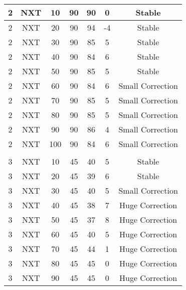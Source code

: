 \begin{longtable}[c]{|ccccccc|}
2  & NXT  & 10     & 90    & 90                & 0          & Stable                  \\\hline
2  & NXT  & 20     & 90    & 94                & -4         & Stable                  \\\hline
2  & NXT  & 30     & 90    & 85                & 5          & Stable                  \\\hline
2  & NXT  & 40     & 90    & 84                & 6          & Stable                  \\\hline
2  & NXT  & 50     & 90    & 85                & 5          & Stable                  \\\hline
2  & NXT  & 60     & 90    & 84                & 6          & Small Correction        \\\hline
2  & NXT  & 70     & 90    & 85                & 5          & Small Correction        \\\hline
2  & NXT  & 80     & 90    & 85                & 5          & Small Correction        \\\hline
2  & NXT  & 90     & 90    & 86                & 4          & Small Correction        \\\hline
2  & NXT  & 100    & 90    & 84                & 6          & Small Correction        \\\hline
   &      &        &       &                   &            &                         \\\hline
3  & NXT  & 10     & 45    & 40                & 5          & Stable                  \\\hline
3  & NXT  & 20     & 45    & 39                & 6          & Stable                  \\\hline
3  & NXT  & 30     & 45    & 40                & 5          & Small Correction        \\\hline
3  & NXT  & 40     & 45    & 38                & 7          & Huge Correction         \\\hline
3  & NXT  & 50     & 45    & 37                & 8          & Huge Correction         \\\hline
3  & NXT  & 60     & 45    & 40                & 5          & Huge Correction         \\\hline
3  & NXT  & 70     & 45    & 44                & 1          & Huge Correction         \\\hline
3  & NXT  & 80     & 45    & 45                & 0          & Huge Correction         \\\hline
3  & NXT  & 90     & 45    & 45                & 0          & Huge Correction         \\\hline

\end{longtable}
